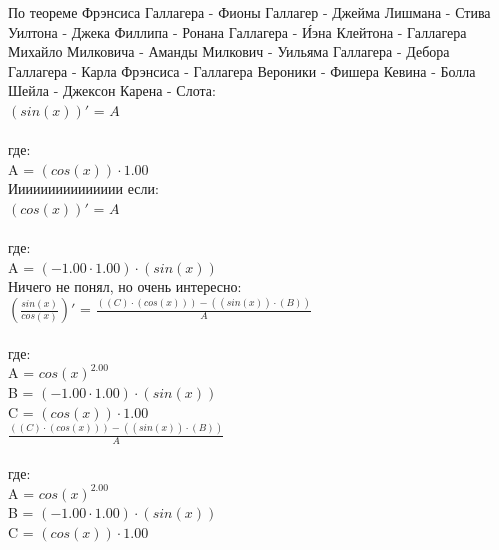 \documentclass{article}
\begin{document}
По теореме Фрэнсиса Галлагера - Фионы Галлагер - Джейма Лишмана - Стива Уилтона - Джека Филлипа - Ронана Галлагера - И́эна Клейтона - Галлагера Михайло Милковича - Аманды Милкович - Уильяма Галлагера - Дебора Галлагера - Карла Фрэнсиса - Галлагера Вероники - Фишера Кевина - Болла Шейла - Джексон Карена - Слота:\n\n
\\$(sin(x))'$ = $A$\\\\ где:\\
A = $(cos(x)) \cdot 1.00$\\
Иииииииииииииии если:\n\n
\\$(cos(x))'$ = $A$\\\\ где:\\
A = $(-1.00 \cdot 1.00) \cdot (sin(x))$\\
Ничего не понял, но очень интересно:\n\n
\\$(\frac{sin(x)}{cos(x)})'$ = $\frac{((C) \cdot (cos(x))) - ((sin(x)) \cdot (B))}{A}$\\\\ где:\\
A = ${cos(x)}^{2.00}$\\
B = $(-1.00 \cdot 1.00) \cdot (sin(x))$\\
C = $(cos(x)) \cdot 1.00$\\
$\frac{((C) \cdot (cos(x))) - ((sin(x)) \cdot (B))}{A}$\\\\ где:\\
A = ${cos(x)}^{2.00}$\\
B = $(-1.00 \cdot 1.00) \cdot (sin(x))$\\
C = $(cos(x)) \cdot 1.00$\\
\end{document}
